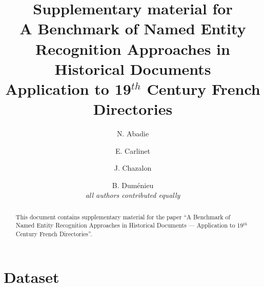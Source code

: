 \documentclass[runningheads,svgnames]{llncs}
\begin{document}
%
\title{%
Supplementary material for\\
A Benchmark of Named Entity Recognition Approaches in Historical Documents\\
Application to 19$^{th}$ Century French Directories%
}
%
%
\author{%
N. Abadie \and
E. Carlinet \and
J. Chazalon \and
B. Duménieu\\
{\footnotesize \emph{all authors contributed equally}}%
}
%
%
%
\maketitle
%
\begin{abstract}
This document contains supplementary material for the paper ``A Benchmark of Named Entity Recognition Approaches in Historical Documents ---
Application to 19$^{th}$ Century French Directories''.
\end{abstract}

\section{Dataset}
\end{document}
